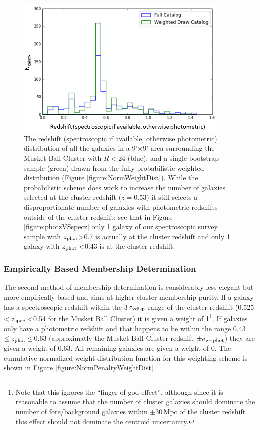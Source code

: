 \begin{figure}
\centering
\includegraphics[width=4in]{Chapter4/AnalysisFiles/zdist_randomweightdraw_reformat.png}
\caption[Comparison of parent galaxy redshift distribution with weighted random draw distribution.]{
The redshift (spectroscopic if available, otherwise photometric) distribution of all the galaxies in a 9'$\times$9' area surrounding the Musket Ball Cluster with $R<$24 (blue); and a single bootstrap sample (green) drawn from the fully probabilistic weighted distribution (Figure \ref{figure:NormWeightDist}).
While the probabilistic scheme does work to increase the number of galaxies selected at the cluster redshift ($z=0.53$) it still selects a disproportionate number of galaxies with photometric redshifts outside of the cluster redshift; see that in Figure \ref{figure:photzVSspecz} only 1 galaxy of our spectroscopic survey sample with $z_{\rm phot}$>0.7 is actually at the cluster redshift and only 1 galaxy with $z_{\rm phot}<$0.43 is at the cluster redshift.
}
\label{figure:ProbWeightDist}
\end{figure}


\subsubsection{Empirically Based Membership Determination}\label{section:EmpiricalWeightScheme}

The second method of membership determination is considerably less elegant but more empirically based and aims at higher cluster membership purity.
If a galaxy has a spectroscopic redshift within the 3$\sigma_{\rm vdisp}$ range of the cluster redshift (0.525$<z_{\rm spec}<$0.54 for the Musket Ball Cluster) it is given a weight of 1\footnote{
Note that this ignores the ``finger of god effect'', although since it is reasonable to assume that the number of cluster galaxies should dominate the number of fore/background galaxies within $\pm$30\,Mpc of the cluster redshift this effect should not dominate the centroid uncertainty.}.
If galaxies only have a photometric redshift and that happens to be within the range 0.43$\leq z_{\rm phot} \leq$0.63 (approximatly the Musket Ball Cluster redshift $\pm \sigma_{\rm z-phot}$) they are given a weight of 0.63.
All remaining galaxies are given a weight of 0.
The cumulative normalized weight distribution function for this weighting scheme is shown in Figure \ref{figure:NormPenaltyWeightDist}.

